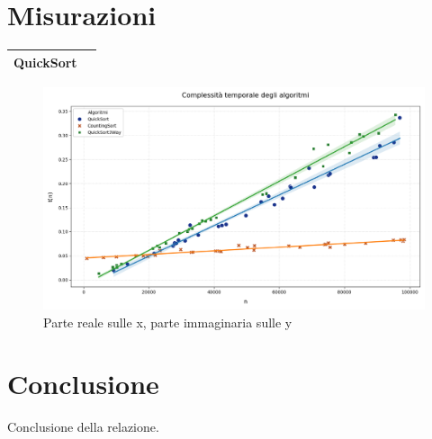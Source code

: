\documentclass[a4paper, 11pt]{article}
\begin{document}
\section{Misurazioni}

\begin{table} [H]
    \centering
    \begin{tabular}{|c|c|}
        \hline
        QuickSort \\ [0.1 cm]
        \hline
    \end{tabular}
\end{table}

\begin{figure} [H]
    \centering
    \includegraphics[scale=0.5]{Immagini/Grafico.png}
    \caption*{Parte reale sulle x, parte immaginaria sulle y}
\end{figure}

\section{Conclusione}
Conclusione della relazione.
\end{document}
